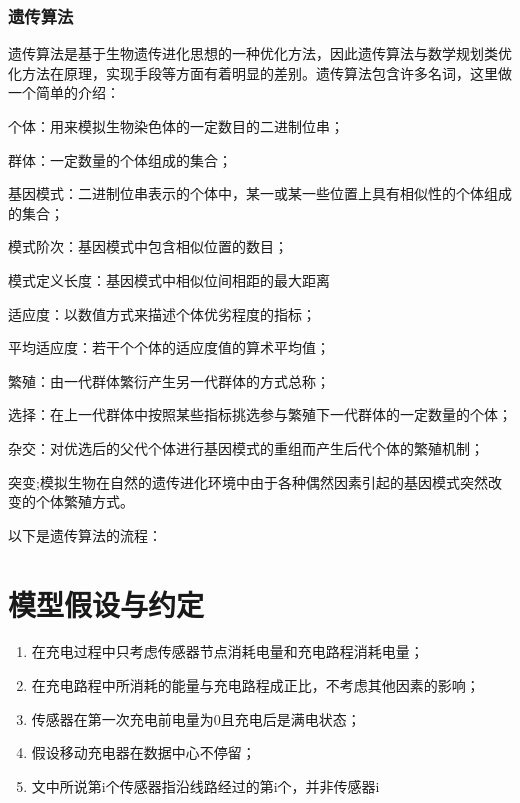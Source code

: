 \documentclass{article}
\begin{document}
\subsubsection{遗传算法}
遗传算法是基于生物遗传进化思想的一种优化方法，因此遗传算法与数学规划类优化方法在原理，实现手段等方面有着明显的差别。遗传算法包含许多名词，这里做一个简单的介绍：

个体：用来模拟生物染色体的一定数目的二进制位串；

群体：一定数量的个体组成的集合；

基因模式：二进制位串表示的个体中，某一或某一些位置上具有相似性的个体组成的集合；

模式阶次：基因模式中包含相似位置的数目；

模式定义长度：基因模式中相似位间相距的最大距离

适应度：以数值方式来描述个体优劣程度的指标；

平均适应度：若干个个体的适应度值的算术平均值；

繁殖：由一代群体繁衍产生另一代群体的方式总称；

选择：在上一代群体中按照某些指标挑选参与繁殖下一代群体的一定数量的个体；

杂交：对优选后的父代个体进行基因模式的重组而产生后代个体的繁殖机制；

突变;模拟生物在自然的遗传进化环境中由于各种偶然因素引起的基因模式突然改变的个体繁殖方式\cite{ref3}。

以下是遗传算法的流程：


\newpage                                                    %
\section{模型假设与约定}
\begin{enumerate}
\item 在充电过程中只考虑传感器节点消耗电量和充电路程消耗电量；
\item 在充电路程中所消耗的能量与充电路程成正比，不考虑其他因素的影响；
\item 传感器在第一次充电前电量为0且充电后是满电状态；
\item 假设移动充电器在数据中心不停留；
\item 文中所说第i个传感器指沿线路经过的第i个，并非传感器i
\end{enumerate}
\vspace{4em}
\end{document}
